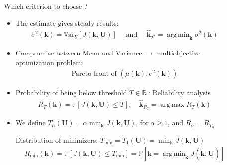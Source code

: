 \message{ !name(beamer_poster_2col.tex)}\documentclass{beamer}
\newlength{\sepwid}
\newlength{\sndcolwid}
\newcommand{\Var}{\mathbb{V}\mathrm{ar}}
\newcommand{\Prob}{\mathbb{P}}
\DeclareMathOperator*{\argmin}{arg\,min}
\DeclareMathOperator*{\argmax}{arg\,max}
\newcommand{\kest}{\hat{\bm{k}}}
\begin{document}
\begin{frame}[t]
\begin{columns}[t]
\begin{column}{\sndcolwid}
\begin{block}{Which criterion to choose ? \nocite{lehman_designing_2004}}
\begin{itemize}
 \item The estimate gives \alert{steady results}:
  \begin{align*}
    \sigma^2(\bm{k}) = \Var_U[J(\bm{k},\bm{U})] \quad\text{ and } \quad \kest_{\sigma^2} = \argmin_{\bm{k}} \sigma^2(\bm{k}) \tag{PCE gradient}
  \end{align*}

 
  \item \alert{Compromise} between Mean and Variance $\to$ multiobjective optimization problem:
  \begin{align*}
    \text{Pareto front of } (\mu(\bm{k}),\sigma^2(\bm{k})) \tag{Layered kriging}
  \end{align*}
\item\alert{Probability of being below threshold $T\in \mathbb{R}$} : Reliability analysis
  \begin{align*}
    R_T(\bm{k}) =  \Prob\left[J(\bm{k},\bm{U}) \leq T\right], \quad \kest_{R_T} = \argmax R_T(\bm{k}) \tag{GP simulations}
  \end{align*}


  
\item We define $T_{\alpha}(\bm{U}) = \alpha \min_{\bm{k}} J(\bm{k},\bm{U})$, for $\alpha \geq 1$, and $R_\alpha = R_{T_{\alpha}}$

 Distribution of minimizers: $T_{\min} = T_1(\bm{U})  = \min_{\bm{k}} J(\bm{k},\bm{U})$
  \begin{align*}
    R_{\min}(\bm{k}) = \Prob\left[J(\bm{k},\bm{U}) \leq T_{\min}\right] = \Prob\left[\bm{k} = \argmin_{\tilde{\bm{k}}} J(\tilde{\bm{k}},\bm{U}) \right] \tag{Estimation and maximization of density}
  \end{align*}

\end{itemize}
\end{block}
\end{column}

\begin{column}{\sepwid}\end{column} %
\begin{column}{\sndcolwid} %
 



\end{column}
\end{columns}
\end{frame}
\end{document}
